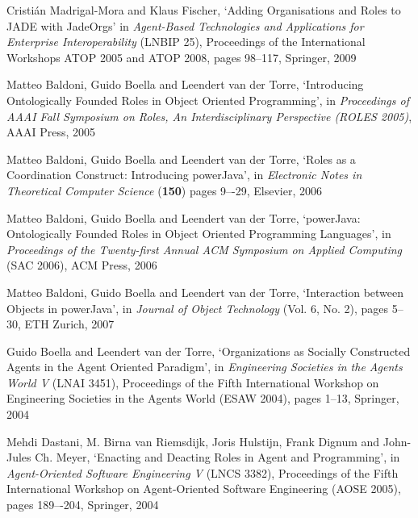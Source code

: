 \begin{thebibliography}{99}
Cristián Madrigal-Mora and Klaus Fischer,
`Adding Organisations and Roles to JADE with JadeOrgs'
in \textit{Agent-Based Technologies and Applications for Enterprise Interoperability} (LNBIP 25),
Proceedings of the International Workshops ATOP 2005 and ATOP 2008,
pages 98--117,
Springer, 2009


Matteo Baldoni, Guido Boella and Leendert van der Torre,
`Introducing Ontologically Founded Roles in Object Oriented Programming',
in \textit{Proceedings of AAAI Fall Symposium on Roles, An Interdisciplinary Perspective (ROLES 2005)},
AAAI Press, 2005

Matteo Baldoni, Guido Boella and Leendert van der Torre,
`Roles as a Coordination Construct: Introducing powerJava',
in \textit{Electronic Notes in Theoretical Computer Science} (\textbf{150})
pages 9–-29,
Elsevier, 2006

Matteo Baldoni, Guido Boella and Leendert van der Torre,
`powerJava: Ontologically Founded Roles in Object Oriented Programming Languages',
in \textit{Proceedings of the Twenty-first Annual ACM Symposium on Applied Computing} (SAC 2006),
ACM Press, 2006

Matteo Baldoni, Guido Boella and Leendert van der Torre,
`Interaction between Objects in powerJava',
in \textit{Journal of Object Technology} (Vol. 6, No. 2),
pages 5--30,
ETH Zurich, 2007


Guido Boella and Leendert van der Torre,
`Organizations as Socially Constructed Agents in the Agent Oriented Paradigm',
in \textit{Engineering Societies in the Agents World V} (LNAI 3451),
Proceedings of the Fifth International Workshop on Engineering Societies in the Agents World (ESAW 2004),
pages 1--13,
Springer, 2004

Mehdi Dastani, M. Birna van Riemsdijk, Joris Hulstijn, Frank Dignum and John-Jules Ch. Meyer,
`Enacting and Deacting Roles in Agent and Programming',
in \textit{Agent-Oriented Software Engineering V} (LNCS 3382),
Proceedings of the Fifth International Workshop on Agent-Oriented Software Engineering (AOSE 2005),
pages 189–-204,
Springer, 2004


\end{thebibliography}
